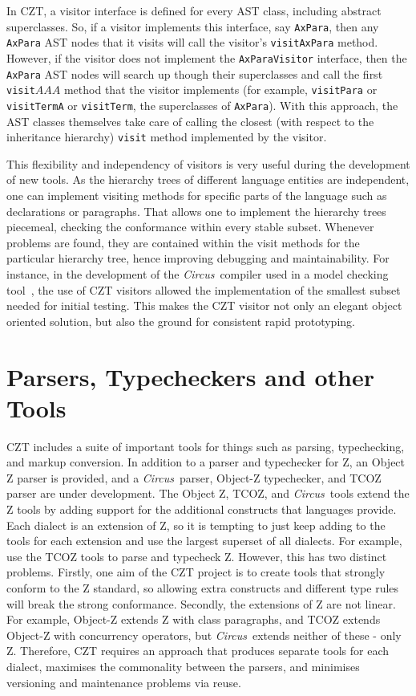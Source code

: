 \documentclass{llncs}
\newcommand{\Circus}{{\sf\slshape Circus}}
\newcommand{\Interface}[1]{\texttt{#1}}
\newcommand{\Method}[1]{\texttt{#1}}
\begin{document}
  In CZT, a visitor interface is defined for every AST class,
  including abstract superclasses. So, if a visitor implements this
  interface, say \Interface{AxPara}, then any \Interface{AxPara} AST nodes
  that it visits will call the visitor's \Method{visitAxPara} method.
  However, if the visitor does not implement the \Interface{AxParaVisitor}
  interface, then the \Interface{AxPara} AST nodes will search up though their
  superclasses and call the first \Method{visit$AAA$} method that the
  visitor implements (for example, \Interface{visitPara} or
  \Interface{visitTermA} or \Interface{visitTerm}, the superclasses of \Interface{AxPara}).
  With this approach, the AST classes themselves take care of calling the
  closest (with respect to the inheritance hierarchy) \Method{visit}
  method implemented by the visitor.

  This flexibility and independency of visitors is very useful during
  the development of new tools.
  As the hierarchy trees of different language entities are independent,
  one can implement visiting methods for specific parts of the language such
  as declarations or paragraphs.
  That allows one to implement the hierarchy trees piecemeal, checking the
  conformance within every stable subset.
  Whenever problems are found, they are contained within the visit methods
  for the particular hierarchy tree, hence improving debugging and maintainability.
  For instance, in the development of the \Circus\ compiler used in a
  model checking tool~\cite{circus.mc:leo}, the use of CZT visitors allowed
  the implementation of the smallest subset needed for initial testing.
  This makes the CZT visitor not only an elegant object oriented solution,
  but also the ground for consistent rapid prototyping.

\section{Parsers, Typecheckers and other Tools}

  CZT includes a suite of important tools for things such as parsing,
  typechecking, and markup conversion. In addition to a parser and
  typechecker for Z, an Object Z parser is provided, and a \Circus\
  parser, Object-Z typechecker, and TCOZ parser are under development.
  The Object Z, TCOZ, and \Circus\ tools extend the Z tools by adding
  support for the additional constructs that languages provide.  Each
  dialect is an extension of Z, so it is tempting to just keep adding
  to the tools for each extension and use the largest superset of all
  dialects. For example, use the TCOZ tools to parse and typecheck
  Z. However, this has two distinct problems. Firstly, one aim of the
  CZT project is to create tools that strongly conform to the Z
  standard, so allowing extra constructs and different type rules will
  break the strong conformance. Secondly, the extensions of Z are not
  linear. For example, Object-Z extends Z with class paragraphs, and
  TCOZ extends Object-Z with concurrency operators, but \Circus\ extends
  neither of these - only Z. Therefore, CZT requires an approach that
  produces separate tools for each dialect, maximises the commonality
  between the parsers, and minimises versioning and maintenance
  problems via reuse.
\end{document}
